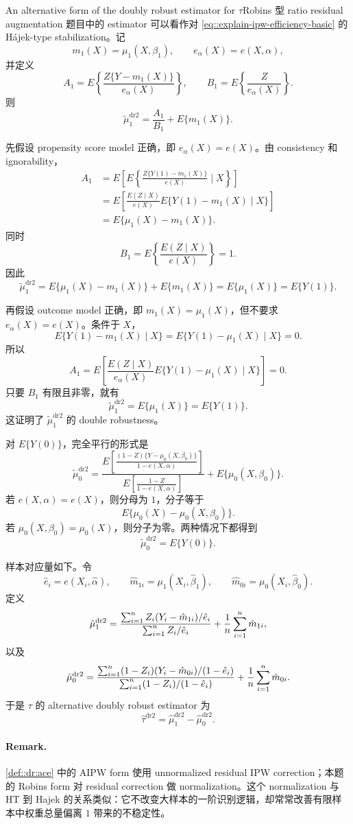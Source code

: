 \begin{exercisesolution}{An alternative form of the doubly robust estimator for $\tau$}{Robins 型 ratio residual augmentation}
题目中的 estimator 可以看作对 \cref{eq::explain-ipw-efficiency-basic} 的 Hájek-type stabilization。记
\[
m_1(X)=\mu_1(X,\beta_1),\qquad e_\alpha(X)=e(X,\alpha),
\]
并定义
\[
A_1=E\left\{\frac{Z\{Y-m_1(X)\}}{e_\alpha(X)}\right\},
\qquad
B_1=E\left\{\frac{Z}{e_\alpha(X)}\right\}.
\]
则
\[
\tilde\mu_1^{\mathrm{dr2}}
=\frac{A_1}{B_1}+E\{m_1(X)\}.
\]

先假设 propensity score model 正确，即 $e_\alpha(X)=e(X)$。由 consistency 和 ignorability，
\begin{align*}
A_1
&=E\left[
E\left\{\frac{Z\{Y(1)-m_1(X)\}}{e(X)}\mid X\right\}
\right] \\
&=E\left[
\frac{E(Z\mid X)}{e(X)}
E\{Y(1)-m_1(X)\mid X\}
\right] \\
&=E\{\mu_1(X)-m_1(X)\}.
\end{align*}
同时
\[
B_1=E\left\{\frac{E(Z\mid X)}{e(X)}\right\}=1.
\]
因此
\[
\tilde\mu_1^{\mathrm{dr2}}
=E\{\mu_1(X)-m_1(X)\}+E\{m_1(X)\}
=E\{\mu_1(X)\}
=E\{Y(1)\}.
\]

再假设 outcome model 正确，即 $m_1(X)=\mu_1(X)$，但不要求 $e_\alpha(X)=e(X)$。条件于 $X$，
\[
E\{Y(1)-m_1(X)\mid X\}=E\{Y(1)-\mu_1(X)\mid X\}=0.
\]
所以
\[
A_1
=E\left[
\frac{E(Z\mid X)}{e_\alpha(X)}
E\{Y(1)-\mu_1(X)\mid X\}
\right]=0.
\]
只要 $B_1$ 有限且非零，就有
\[
\tilde\mu_1^{\mathrm{dr2}}=E\{\mu_1(X)\}=E\{Y(1)\}.
\]
这证明了 $\tilde\mu_1^{\mathrm{dr2}}$ 的 double robustness。

对 $E\{Y(0)\}$，完全平行的形式是
\[
\tilde{\mu}_0^{\mathrm{dr2}}
=
\frac{
E\left[   \frac{(1-Z)\{ Y-\mu_0(X,\beta_0) \}}{1-e(X,\alpha)} \right]
}{
E\left[   \frac{1-Z}{1-e(X,\alpha)} \right]
}
+ E\{\mu_0(X,\beta_0)\}.
\]
若 $e(X,\alpha)=e(X)$，则分母为 $1$，分子等于
\[
E\{\mu_0(X)-\mu_0(X,\beta_0)\}.
\]
若 $\mu_0(X,\beta_0)=\mu_0(X)$，则分子为零。两种情况下都得到
\[
\tilde{\mu}_0^{\mathrm{dr2}}=E\{Y(0)\}.
\]

样本对应量如下。令
\[
\hat e_i=e(X_i,\hat\alpha),\qquad
\hat m_{1i}=\mu_1(X_i,\hat\beta_1),\qquad
\hat m_{0i}=\mu_0(X_i,\hat\beta_0).
\]
定义
\[
\hat\mu_1^{\mathrm{dr2}}
=
\frac{
\sum_{i=1}^n Z_i(Y_i-\hat m_{1i})/\hat e_i
}{
\sum_{i=1}^n Z_i/\hat e_i
}
+\frac{1}{n}\sum_{i=1}^n \hat m_{1i},
\]
以及
\[
\hat\mu_0^{\mathrm{dr2}}
=
\frac{
\sum_{i=1}^n (1-Z_i)(Y_i-\hat m_{0i})/(1-\hat e_i)
}{
\sum_{i=1}^n (1-Z_i)/(1-\hat e_i)
}
+\frac{1}{n}\sum_{i=1}^n \hat m_{0i}.
\]
于是 $\tau$ 的 alternative doubly robust estimator 为
\[
\hat\tau^{\mathrm{dr2}}
=\hat\mu_1^{\mathrm{dr2}}-\hat\mu_0^{\mathrm{dr2}}.
\]

\paragraph{Remark.}
\cref{def::dr:ace} 中的 AIPW form 使用 unnormalized residual IPW correction；本题的 Robins form 对 residual correction 做 normalization。这个 normalization 与 HT 到 Hajek 的关系类似：它不改变大样本的一阶识别逻辑，却常常改善有限样本中权重总量偏离 $1$ 带来的不稳定性。
\end{exercisesolution}


